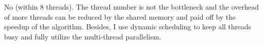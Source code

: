 \documentclass[letterpaper,11pt]{exam}
\begin{document}
\begin{questions}
\begin{enumerate}[label=\roman*.]
              No (within 8 threads). The thread number is not the bottleneck and the overhead of more threads can be reduced by the shared memory and paid off by the speedup of the algorithm.
              Besides, I use dynamic scheduling to keep all threads busy and fully utilize the multi-thread parallelism.

    \end{enumerate}










\end{questions}
\end{document}
